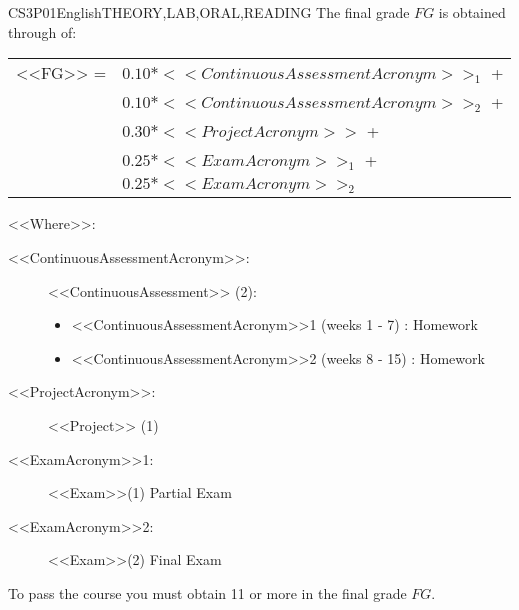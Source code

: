     \begin{evaluation}{CS3P01}{English}{THEORY,LAB,ORAL,READING}
    The final grade $FG$ is obtained through of:
   
    \begin{tabular}{cl}
        <<FG>> = & $0.10*<<ContinuousAssessmentAcronym>>_{1}$ +\\
                 & $0.10*<<ContinuousAssessmentAcronym>>_{2}$ +\\
                 & $0.30*<<ProjectAcronym>>$ + \\
                 & $0.25*<<ExamAcronym>>_{1}$ + \\
                 & $0.25*<<ExamAcronym>>_{2}$
    \end{tabular}
   
    \noindent <<Where>>:
    \begin{description}
    \item[<<ContinuousAssessmentAcronym>>:] <<ContinuousAssessment>> (2):
         \begin{itemize}
               \item  <<ContinuousAssessmentAcronym>>1 (weeks 1 - 7) : Homework
                \item <<ContinuousAssessmentAcronym>>2 (weeks 8 - 15) : Homework 
         \end{itemize}
     \item[<<ProjectAcronym>>:]  <<Project>> (1)
     \item[<<ExamAcronym>>1:] <<Exam>>(1) Partial Exam
     \item[<<ExamAcronym>>2:] <<Exam>>(2) Final Exam
    \end{description}
   
    \noindent To pass the course you must obtain 11 or more in the final grade $FG$.
    \end{evaluation}